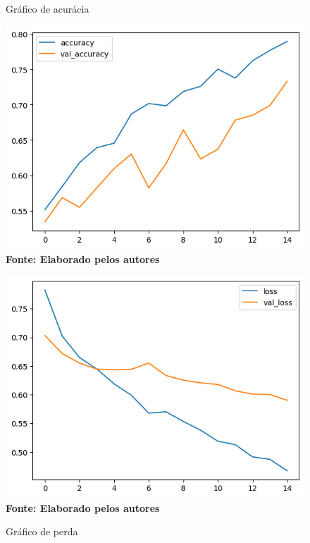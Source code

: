 \begin{figure}[ht]
\centering
\begin{minipage}{0.45\textwidth}
  \centering
  \caption[\hspace{0.1cm}Grade Computacional.]{Gráfico de acurácia}
  \vspace{-0.4cm}
  \includegraphics[width=\linewidth]{figuras/accuracy.png}
  \captionsetup{justification=centering}
  \vspace{-0.2cm}
  \\\textbf{\footnotesize Fonte: Elaborado pelos autores}
  \label{fig:acc10}
\end{minipage}\hfill
\begin{minipage}{0.45\textwidth}
  \centering
  \caption[\hspace{0.1cm}Grade Computacional.]{Gráfico de perda}
  \vspace{-0.4cm}
  \includegraphics[width=\linewidth]{figuras/loss.png}
  \captionsetup{justification=centering}
  \vspace{-0.2cm}
  \\\textbf{\footnotesize Fonte: Elaborado pelos autores}
  \label{fig:loss10}
\end{minipage}
\end{figure}

